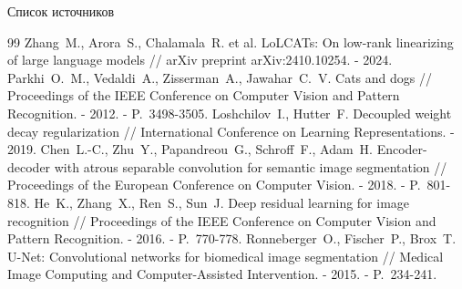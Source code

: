 \documentclass[aspectratio=169,xcolor=table]{beamer}
\begin{document}
\begin{frame}[allowframebreaks]{Список источников}
\begin{thebibliography}{99}
     Zhang~M., Arora~S., Chalamala~R. et al. LoLCATs: On low-rank linearizing of large language models // arXiv preprint arXiv:2410.10254. - 2024.
     Parkhi~O.~M., Vedaldi~A., Zisserman~A., Jawahar~C.~V. Cats and dogs // Proceedings of the IEEE Conference on Computer Vision and Pattern Recognition. - 2012. - P.~3498-3505.
     Loshchilov~I., Hutter~F. Decoupled weight decay regularization // International Conference on Learning Representations. - 2019.
     Chen~L.-C., Zhu~Y., Papandreou~G., Schroff~F., Adam~H. Encoder-decoder with atrous separable convolution for semantic image segmentation // Proceedings of the European Conference on Computer Vision. - 2018. - P.~801-818.
     He~K., Zhang~X., Ren~S., Sun~J. Deep residual learning for image recognition // Proceedings of the IEEE Conference on Computer Vision and Pattern Recognition. - 2016. - P.~770-778.
     Ronneberger~O., Fischer~P., Brox~T. U-Net: Convolutional networks for biomedical image segmentation // Medical Image Computing and Computer-Assisted Intervention. - 2015. - P.~234-241.
  \end{thebibliography}
\end{frame}
\end{document}

